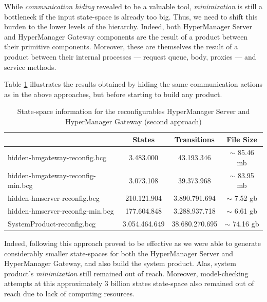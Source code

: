 	While \textit{communication hiding} revealed to be a valuable tool,  \textit{minimization} is 
	still a bottleneck if the input state-space is already too big. Thus, we need to shift this burden to the
	lower levels of the hierarchy. Indeed, both \textsf{HyperManager Server} and \textsf{HyperManager Gateway} components
	are the result of a product between their primitive components. Moreover, these are themselves
	the result of a product between their internal processes --- request queue, body, proxies --- and service methods.
	
	Table \ref{tab:model3} illustrates the results obtained by \textsf{hiding} the same communication actions
	as in the above approaches, but before starting to build any product.

\begin{table}[H]
\begin{center}
\begin{tabular}{| l | c | c | c |}
\hline
                             &  \textbf{States} & \textbf{Transitions} & \textbf{File Size} \\
\hline
 
  \textsf{hidden-hmgateway-reconfig.bcg}                    & 3.483.000   & 43.193.346  &      $\sim$  85.46 mb \\
  \textsf{hidden-hmgateway-reconfig-min.bcg}           &  3.073.108    &  39.373.968   &    $\sim$  83.95 mb \\
  \hline

  \textsf{hidden-hmserver-reconfig.bcg}                    &  210.121.904   & 3.890.791.694   &  $\sim$  7.52 gb\\
  \textsf{hidden-hmserver-reconfig-min.bcg}            &  177.604.848   &  3.288.937.718  &  $\sim$ 6.61 gb \\
  \hline

\textsf{SystemProduct-reconfig.bcg}                    &  3.054.464.649  & 38.680.270.695 &  $\sim$  74.16 gb\\  
 
  \hline
\end{tabular}
\end{center}
\caption{State-space information for the reconfigurables \textsf{HyperManager Server} and \textsf{HyperManager Gateway} (second approach)}
\label{tab:model3}
\end{table}


	Indeed, following this approach proved to be effective as we were able to generate considerably smaller
	state-spaces for both the \textsf{HyperManager Server} and \textsf{HyperManager Gateway}, and also
	build the system product. Alas, system product's \textit{minimization} still remained out of reach. Moreover,
	model-checking attempts at this approximately 3 billion states state-space also remained out of reach due to 
	lack of computing resources.	
	
